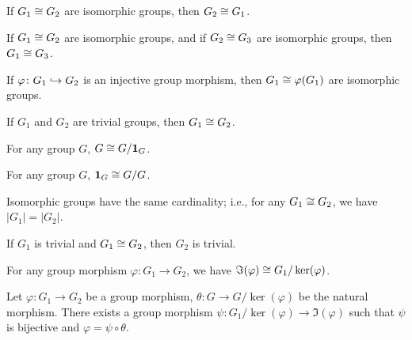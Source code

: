 \begin{theorem}
If $G_{1}\cong G_{2}$ are isomorphic groups, then $G_{2}\cong G_{1}$.
\end{theorem}

\begin{theorem}
If $G_{1}\cong G_{2}$ are isomorphic groups, and if $G_{2}\cong G_{3}$ are
isomorphic groups, then $G_{1}\cong G_{3}$.
\end{theorem}

\begin{theorem}
If $\varphi\colon G_{1}\hookrightarrow G_{2}$ is an injective group morphism,
then $G_{1}\cong\varphi(G_{1})$ are isomorphic groups.
\end{theorem}

\begin{theorem}
If $G_{1}$ and $G_{2}$ are trivial groups, then $G_{1}\cong G_{2}$.
\end{theorem}

\begin{theorem}
For any group $G$, $G\cong G/\mathbf{1}_{G}$.
\end{theorem}

\begin{theorem}
For any group $G$, $\mathbf{1}_{G}\cong G/G$.
\end{theorem}

\begin{theorem}
Isomorphic groups have the same cardinality; i.e., for any $G_{1}\cong G_{2}$,
we have $|G_{1}|=|G_{2}|$.
\end{theorem}

\begin{theorem}
If $G_{1}$ is trivial and $G_{1}\cong G_{2}$, then $G_{2}$ is trivial.
\end{theorem}

\begin{theorem}
For any group morphism $\varphi\colon G_{1}\to G_{2}$, we have 
$\Im(\varphi)\cong G_{1}/\ker(\varphi)$.
\end{theorem}

\begin{theorem}
Let $\varphi\colon G_{1}\to G_{2}$ be a group morphism,
$\theta\colon G\to G/\ker(\varphi)$ be the natural morphism.
There exists a group morphism $\psi\colon G_{1}/\ker(\varphi)\to\Im(\varphi)$
such that $\psi$ is bijective and $\varphi = \psi\circ\theta$.
\end{theorem}

